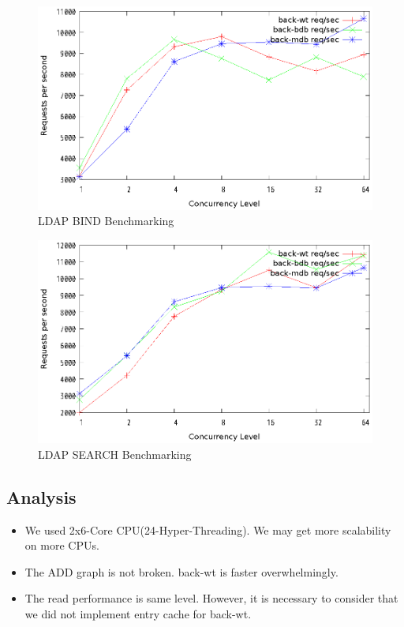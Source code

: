 \documentclass[a4paper,twocolumn,11pt]{article}
\providecommand{\tightlist}{%
      \setlength{\itemsep}{0pt}\setlength{\parskip}{0pt}}
\begin{document}
\begin{figure}[H]
\centering
\includegraphics[width=0.9\columnwidth]{benchmark/bind.eps}
\caption{LDAP BIND Benchmarking}
\end{figure}

\begin{figure}[H]
\centering
\includegraphics[width=0.9\columnwidth]{benchmark/search.eps}
\caption{LDAP SEARCH Benchmarking}
\end{figure}

\subsection{Analysis}\label{analysis}

\begin{itemize}
\tightlist
\item
  We used 2x6-Core CPU(24-Hyper-Threading). We may get more scalability
  on more CPUs.
\item
  The ADD graph is not broken. back-wt is faster overwhelmingly.
\item
  The read performance is same level. However, it is necessary to
  consider that we did not implement entry cache for back-wt.
\end{itemize}
\end{document}

